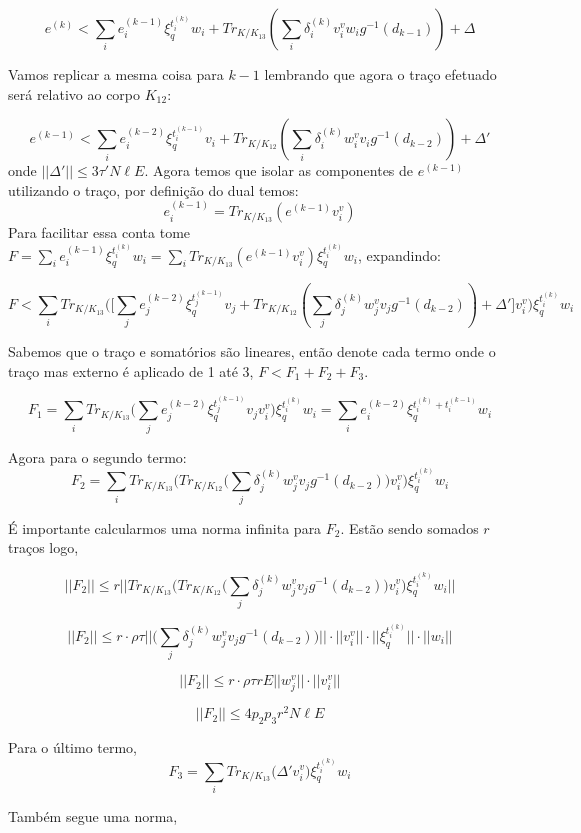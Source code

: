 $$
e^{(k)} < \sum_i e_i^{(k-1)} \xi_q^{t^{(k)}_i} w_i + Tr_{K / K_{13}}(\sum_i \delta_i^{(k)} v_i^v w_i g^{-1}(d_{k-1})) +  \Delta
$$

Vamos replicar a mesma coisa para $k-1$ lembrando que agora o traço efetuado será relativo ao corpo $K_{12}$:

$$
e^{(k-1)} < \sum_i e_i^{(k-2)} \xi_q^{t^{(k-1)}_i} v_i + Tr_{K / K_{12}}(\sum_i \delta_i^{(k)} w_i^v v_i g^{-1}(d_{k-2})) + \Delta'
$$
onde $||\Delta'|| \le 3 \tau'N\ell E$. Agora temos que isolar as componentes de $e^{(k-1)}$ utilizando o traço, por definição do dual temos:
$$
     e_i^{(k-1)} = Tr_{K /K_{13}} (e^{(k-1)} v_i^v)
$$
Para facilitar essa conta tome $F = \sum_i e_i^{(k-1)} \xi_q^{t^{(k)}_i} w_i = \sum_i Tr_{K / K_{13}} (e^{(k-1)} v_i^v) \xi_q^{t^{(k)}_i} w_i$, expandindo:

$$
F < \sum_i Tr_{K / K_{13}} \big( \big[ \sum_j e_j^{(k-2)} \xi_q^{t^{(k-1)}_j} v_j + Tr_{K / K_{12}}(\sum_j \delta_j^{(k)} w_j^v v_j g^{-1}(d_{k-2})) + \Delta' \big] v_i^v \big) \xi_q^{t^{(k)}_i} w_i 
$$

Sabemos que o traço e somatórios são lineares, então denote cada termo onde o traço mas externo é aplicado de 1 até 3, $F < F_1 + F_2 + F_3$.

$$
F_1 = \sum_i Tr_{K / K_{13}} \big( \sum_j e_j^{(k-2)} \xi_q^{t^{(k-1)}_j} v_j v_i^v \big) \xi_q^{t^{(k)}_i} w_i = \sum_i e_i^{(k-2)} \xi_q^{t^{(k)}_i + t^{(k-1)}_i} w_i 
$$

Agora para o segundo termo:
$$
F_2 = \sum_i Tr_{K / K_{13}} \big( Tr_{K / K_{12}} \big(\sum_j \delta_j^{(k)} w_j^v v_j g^{-1}(d_{k-2})\big)  v_i^v \big) \xi_q^{t^{(k)}_i} w_i 
$$

É importante calcularmos uma norma infinita para $F_2$. Estão sendo somados $r$ traços logo, 

$$
||F_2|| \le r ||Tr_{K / K_{13}} \big( Tr_{K / K_{12}} \big(\sum_j \delta_j^{(k)} w_j^v v_j g^{-1}(d_{k-2})\big)  v_i^v \big) \xi_q^{t^{(k)}_i} w_i ||
$$

$$
||F_2|| \le r \cdot  \rho \tau || \big(\sum_j \delta_j^{(k)} w_j^v v_j g^{-1}(d_{k-2})\big) || \cdot  ||v_i^v|| \cdot  ||\xi_q^{t^{(k)}_i}|| \cdot ||w_i ||
$$

$$
||F_2|| \le r \cdot  \rho \tau r E ||w_j^v||\cdot ||v_i^v||
$$


$$
||F_2|| \le 4 p_2p_3r^2 N \ell E
$$

Para o último termo,
$$
F_3 = \sum_i Tr_{K / K_{13}} \big( \Delta'  v_i^v \big) \xi_q^{t^{(k)}_i} w_i 
$$

Também segue uma norma,

